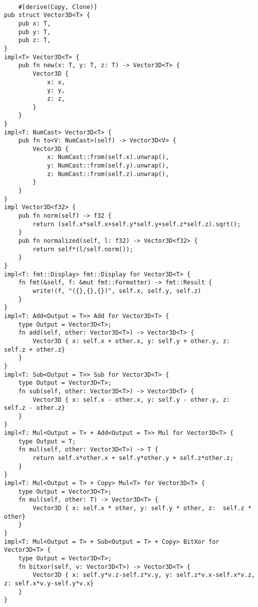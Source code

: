 \begin{lstlisting}[style=rust, label=lst:zBuffer, caption={Реализация алгоритма Z-буффера}]

    #[derive(Copy, Clone)]
pub struct Vector3D<T> {
    pub x: T,
    pub y: T,
    pub z: T,
}
impl<T> Vector3D<T> {
    pub fn new(x: T, y: T, z: T) -> Vector3D<T> {
        Vector3D {
            x: x,
            y: y,
            z: z,
        }
    }
}
impl<T: NumCast> Vector3D<T> {
    pub fn to<V: NumCast>(self) -> Vector3D<V> {
        Vector3D {
            x: NumCast::from(self.x).unwrap(),
            y: NumCast::from(self.y).unwrap(),
            z: NumCast::from(self.z).unwrap(),
        }
    }
}
impl Vector3D<f32> {
    pub fn norm(self) -> f32 {
        return (self.x*self.x+self.y*self.y+self.z*self.z).sqrt();
    }
    pub fn normalized(self, l: f32) -> Vector3D<f32> {
        return self*(l/self.norm());
    }
}
impl<T: fmt::Display> fmt::Display for Vector3D<T> {
    fn fmt(&self, f: &mut fmt::Formatter) -> fmt::Result {
        write!(f, "({},{},{})", self.x, self.y, self.z)
    }
}
impl<T: Add<Output = T>> Add for Vector3D<T> {
    type Output = Vector3D<T>;
    fn add(self, other: Vector3D<T>) -> Vector3D<T> {
        Vector3D { x: self.x + other.x, y: self.y + other.y, z:  self.z + other.z}
    }
}
impl<T: Sub<Output = T>> Sub for Vector3D<T> {
    type Output = Vector3D<T>;
    fn sub(self, other: Vector3D<T>) -> Vector3D<T> {
        Vector3D { x: self.x - other.x, y: self.y - other.y, z:  self.z - other.z}
    }
}
impl<T: Mul<Output = T> + Add<Output = T>> Mul for Vector3D<T> {
    type Output = T;
    fn mul(self, other: Vector3D<T>) -> T {
        return self.x*other.x + self.y*other.y + self.z*other.z;
    }
}
impl<T: Mul<Output = T> + Copy> Mul<T> for Vector3D<T> {
    type Output = Vector3D<T>;
    fn mul(self, other: T) -> Vector3D<T> {
        Vector3D { x: self.x * other, y: self.y * other, z:  self.z * other}
    }
}
impl<T: Mul<Output = T> + Sub<Output = T> + Copy> BitXor for Vector3D<T> {
    type Output = Vector3D<T>;
    fn bitxor(self, v: Vector3D<T>) -> Vector3D<T> {
        Vector3D { x: self.y*v.z-self.z*v.y, y: self.z*v.x-self.x*v.z, z: self.x*v.y-self.y*v.x}
    }
}
\end{lstlisting}

